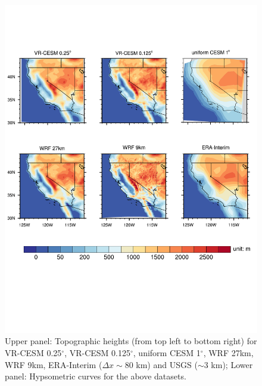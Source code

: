 \documentclass[draft,ms]{agutex}   %
\begin{document}
\begin{figure}
\begin{center}
\includegraphics[width=6in]{topo.pdf}
\end{center}
\caption{Upper panel: Topographic heights (from top left to bottom right) for VR-CESM 0.25$^\circ$, VR-CESM 0.125$^\circ$, uniform CESM 1$^\circ$, WRF 27km, WRF 9km, ERA-Interim ($\Delta x \sim$80 km) and USGS ($\sim$3 km); Lower panel: Hypsometric curves for the above datasets.} \label{fig:Figure 2} 
\end{figure}
\end{document}
